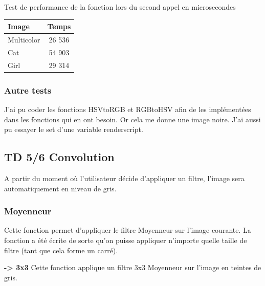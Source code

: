 \documentclass{article}
\begin{document}
\begin{center}
\medbreak
Test de performance de la fonction lors du second appel en microsecondes
\bigbreak
   \begin{tabular}{ | l | c | }
     \hline
     Image & Temps \\
     \hline
     Multicolor & 26 536 \\
     \hline
     Cat & 54 903 \\
     \hline
     Girl & 29 314 \\
     \hline
   \end{tabular}
 \end{center}
\bigbreak

\subsubsection{Autre tests}

J'ai pu coder les fonctions HSVtoRGB et RGBtoHSV afin de les implémentées dans les fonctions qui en ont besoin. Or cela me donne une image noire. J'ai aussi pu essayer le set d'une variable renderscript.

\newpage
\subsection{TD 5/6 Convolution}

A partir du moment où l'utilisateur décide d'appliquer un filtre, l'image sera automatiquement en niveau de gris.

\subsubsection{Moyenneur}

Cette fonction permet d'appliquer le filtre Moyenneur sur l'image courante. La fonction a été écrite de sorte qu'on puisse appliquer n'importe quelle taille de filtre (tant que cela forme un carré).

\textbf{-> 3x3}
Cette fonction applique un filtre 3x3 Moyenneur sur l'image en teintes de gris.
\end{document}
